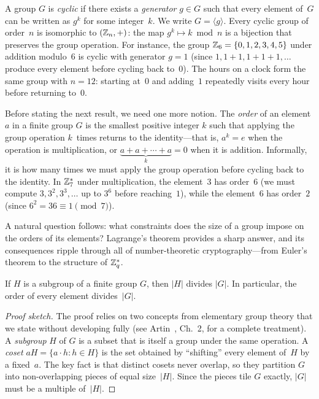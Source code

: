 \begin{definition}
\label{def:cyclic-group}
A group $G$ is \emph{cyclic} if there exists a \emph{generator} $g \in G$ such that every element of~$G$ can be written as $g^k$ for some integer~$k$.  We write $G = \langle g \rangle$.  Every cyclic group of order~$n$ is isomorphic to $(\mathbb{Z}_n, +)$: the map $g^k \mapsto k \bmod n$ is a bijection that preserves the group operation.  For instance, the group $\mathbb{Z}_6 = \{0,1,2,3,4,5\}$ under addition modulo~6 is cyclic with generator $g = 1$ (since $1, 1{+}1, 1{+}1{+}1, \ldots$ produce every element before cycling back to~$0$).  The hours on a clock form the same group with $n = 12$: starting at~$0$ and adding~$1$ repeatedly visits every hour before returning to~$0$.
\end{definition}

Before stating the next result, we need one more notion.  The \emph{order} of an element $a$ in a finite group $G$ is the smallest positive integer $k$ such that applying the group operation $k$~times returns to the identity---that is, $a^k = e$ when the operation is multiplication, or $\underbrace{a + a + \cdots + a}_{k} = 0$ when it is addition.  Informally, it is how many times we must apply the group operation before cycling back to the identity.  In $\mathbb{Z}_7^*$ under multiplication, the element~$3$ has order~$6$ (we must compute $3, 3^2, 3^3, \ldots$ up to $3^6$ before reaching~$1$), while the element~$6$ has order~$2$ (since $6^2 = 36 \equiv 1 \pmod{7}$).

A natural question follows: what constraints does the size of a group impose on the orders of its elements?  Lagrange's theorem provides a sharp answer, and its consequences ripple through all of number-theoretic cryptography---from Euler's theorem to the structure of $\mathbb{Z}_q^*$.

\begin{theorem}
\label{thm:lagrange}
If $H$ is a subgroup of a finite group $G$, then $|H|$ divides $|G|$.  In particular, the order of every element divides~$|G|$.
\end{theorem}

\begin{proof}[Proof sketch]
The proof relies on two concepts from elementary group theory that we state without developing fully (see Artin~\cite{Artin2011}, Ch.~2, for a complete treatment).  A \emph{subgroup} $H$ of $G$ is a subset that is itself a group under the same operation.  A \emph{coset} $aH = \{a \cdot h : h \in H\}$ is the set obtained by ``shifting'' every element of~$H$ by a fixed~$a$.  The key fact is that distinct cosets never overlap, so they partition $G$ into non-overlapping pieces of equal size~$|H|$.  Since the pieces tile $G$ exactly, $|G|$ must be a multiple of~$|H|$.
\end{proof}

